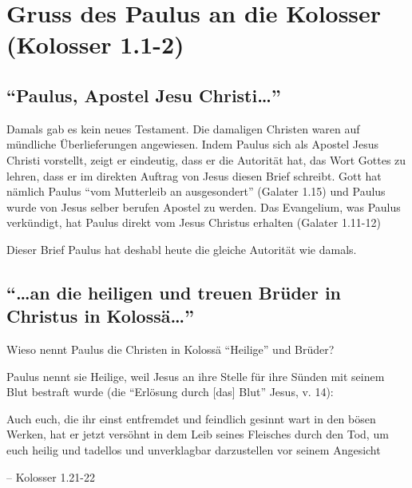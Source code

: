 \documentclass[
  12pt,
]{krantz}
\makeatletter
\newenvironment{kframe}{%
\medskip{}
\setlength{\fboxsep}{.8em}
 \def\at@end@of@kframe{}%
 \ifinner\ifhmode%
  \def\at@end@of@kframe{\end{minipage}}%
  \begin{minipage}{\columnwidth}%
 \fi\fi%
 \def\FrameCommand##1{\hskip\@totalleftmargin \hskip-\fboxsep
 \colorbox{shadecolor}{##1}\hskip-\fboxsep
     \hskip-\linewidth \hskip-\@totalleftmargin \hskip\columnwidth}%
 \MakeFramed {\advance\hsize-\width
   \@totalleftmargin\z@ \linewidth\hsize
   \@setminipage}}%
 {\par\unskip\endMakeFramed%
 \at@end@of@kframe}
\newenvironment{rmdblock}[1]
  {
  \begin{itemize}
  \renewcommand{\labelitemi}{
    \raisebox{-.7\height}[0pt][0pt]{
      {\setkeys{Gin}{width=3em,keepaspectratio}\texttt{[image: img/\#1]}}
    }
  }
  \setlength{\fboxsep}{1em}
  \begin{kframe}
  \item
  }
  {
  \end{kframe}
  \end{itemize}
  }
\newenvironment{rmdquote}
  {\begin{rmdblock}{quote}}
  {\end{rmdblock}}
\makeatother
\begin{document}
\hypertarget{gruss-des-paulus-an-die-kolosser-kolosser-1.1-2}{%
\section{Gruss des Paulus an die Kolosser (Kolosser 1.1-2)}\label{gruss-des-paulus-an-die-kolosser-kolosser-1.1-2}}

\hypertarget{paulus-apostel-jesu-christi}{%
\subsection{\texorpdfstring{``Paulus, Apostel Jesu Christi\ldots{}''}{``Paulus, Apostel Jesu Christi\ldots''}}\label{paulus-apostel-jesu-christi}}

Damals gab es kein neues Testament. Die damaligen Christen waren auf mündliche
Überlieferungen angewiesen. Indem Paulus sich als Apostel Jesus Christi
vorstellt, zeigt er eindeutig, dass er die Autorität hat, das Wort Gottes zu
lehren, dass er im direkten Auftrag von Jesus diesen Brief schreibt.
Gott hat nämlich Paulus ``vom Mutterleib an ausgesondert'' (Galater 1.15)
und Paulus wurde von Jesus selber berufen Apostel zu werden. Das Evangelium,
was Paulus verkündigt, hat Paulus direkt vom Jesus Christus erhalten (Galater 1.11-12)

Dieser Brief Paulus
hat deshabl heute die gleiche Autorität wie damals.

\hypertarget{an-die-heiligen-und-treuen-bruxfcder-in-christus-in-kolossuxe4}{%
\subsection{\texorpdfstring{``\ldots an die heiligen und treuen Brüder in Christus in Kolossä\ldots{}''}{``\ldots an die heiligen und treuen Brüder in Christus in Kolossä\ldots''}}\label{an-die-heiligen-und-treuen-bruxfcder-in-christus-in-kolossuxe4}}

Wieso nennt Paulus die Christen in Kolossä ``Heilige'' und Brüder?

Paulus nennt sie Heilige, weil Jesus an ihre Stelle für ihre Sünden mit seinem
Blut bestraft wurde (die ``Erlösung durch {[}das{]} Blut'' Jesus, v. 14):

\begin{rmdquote}
Auch euch, die ihr einst entfremdet und feindlich gesinnt wart in den
bösen Werken, hat er jetzt versöhnt in dem Leib seines Fleisches durch
den Tod, um euch heilig und tadellos und unverklagbar darzustellen vor
seinem Angesicht

-- Kolosser 1.21-22
\end{rmdquote}
\end{document}
